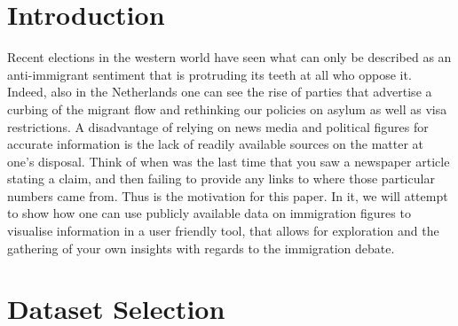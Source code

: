\documentclass[11pt,a4paper,titlepage]{article}
\begin{document}
\setcounter{page}{1}

\section{Introduction}

Recent elections in the western world have seen what can only be described as an anti-immigrant sentiment that is protruding its teeth at all who oppose it. Indeed, also in the Netherlands one can see the rise of parties that advertise a curbing of the migrant flow and rethinking our policies on asylum as well as visa restrictions. A disadvantage of relying on news media and political figures for accurate information is the lack of readily available sources on the matter at one's disposal. Think of when was the last time that you saw a newspaper article stating a claim, and then failing to provide any links to where those particular numbers came from. Thus is the motivation for this paper. In it, we will attempt to show how one can use publicly available data on immigration figures to visualise information in a user friendly tool, that allows for exploration and the gathering of your own insights with regards to the immigration debate.

\section{Dataset Selection}
\end{document}
